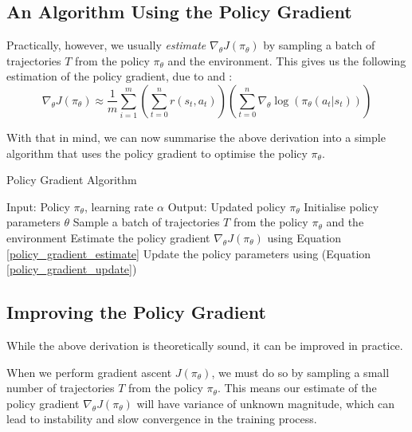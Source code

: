 \documentclass{article} %
\begin{document}
\subsection{An Algorithm Using the Policy Gradient}


Practically, however, we usually \textit{estimate} $\nabla_\theta J(\pi_\theta)$ by sampling a batch of trajectories $T$ from the policy $\pi_\theta$ and the environment.
This gives us the following estimation of the policy gradient, due to \cite{Sutton-and-Barto-1998} and \cite{SpinningUp-2018}:
\begin{equation} \label{policy_gradient_estimate}
    \nabla_\theta J(\pi_\theta) \approx \frac{1}{m} \sum_{i=1}^{m} \left(\sum_{t=0}^{n} r(s_t, a_t)\right) \left( \sum_{t=0}^{n} \nabla_\theta \log(\pi_\theta(a_t | s_t)) \right)
\end{equation}

With that in mind, we can now summarise the above derivation into a simple algorithm that uses the policy gradient to optimise the policy $\pi_\theta$.

\begin{algorithm}[H]
    \caption{Policy Gradient Algorithm}
    \label{alg:policy_gradient}
    \begin{algorithmic}[1]
        \State Input: Policy $\pi_\theta$, learning rate $\alpha$
        \State Output: Updated policy $\pi_\theta$
        \State Initialise policy parameters $\theta$
            \State Sample a batch of trajectories $T$ from the policy $\pi_\theta$ and the environment
            \State Estimate the policy gradient $\nabla_\theta J(\pi_\theta)$ using Equation \eqref{policy_gradient_estimate}
            \State Update the policy parameters using (Equation \eqref{policy_gradient_update})
        \EndWhile
    \end{algorithmic}
\end{algorithm}

\subsection{Improving the Policy Gradient}

While the above derivation is theoretically sound, it can be improved in practice.

When we perform gradient ascent $J(\pi_\theta)$, 
we must do so by sampling a small number of trajectories $T$ from the policy $\pi_\theta$.
This means our estimate of the policy gradient $\nabla_\theta J(\pi_\theta)$ will have
variance of unknown magnitude, which can lead to instability and slow convergence in the training process. 
\end{document}
